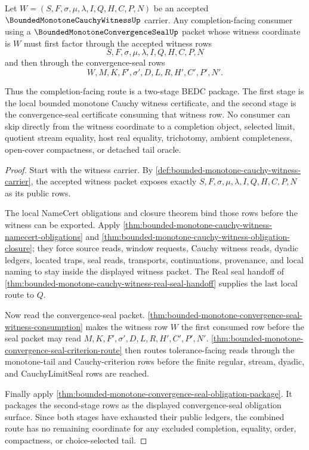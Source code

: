 \begin{theorem}
\label{thm:bounded-monotone-cauchy-witness-convergence-seal-factorization}
Let $W=(S,F,\sigma,\mu,\lambda,I,Q,H,C,P,N)$ be an accepted $\BoundedMonotoneCauchyWitnessUp$ carrier. Any completion-facing consumer using a $\BoundedMonotoneConvergenceSealUp$ packet whose witness coordinate is $W$ must first factor through the accepted witness rows
$$
S,F,\sigma,\mu,\lambda,I,Q,H,C,P,N
$$
and then through the convergence-seal rows
$$
W,M,K,F',\sigma',D,L,R,H',C',P',N'.
$$

Thus the completion-facing route is a two-stage BEDC package. The first stage is the local bounded monotone Cauchy witness certificate, and the second stage is the convergence-seal certificate consuming that witness row. No consumer can skip directly from the witness coordinate to a completion object, selected limit, quotient stream equality, host real equality, trichotomy, ambient completeness, open-cover compactness, or detached tail oracle.
\end{theorem}
\begin{proof}
Start with the witness carrier. By \autoref{def:bounded-monotone-cauchy-witness-carrier}, the accepted witness packet exposes exactly $S,F,\sigma,\mu,\lambda,I,Q,H,C,P,N$ as its public rows.

The local NameCert obligations and closure theorem bind those rows before the witness can be exported. Apply \autoref{thm:bounded-monotone-cauchy-witness-namecert-obligations} and \autoref{thm:bounded-monotone-cauchy-witness-obligation-closure}; they force source reads, window requests, Cauchy witness reads, dyadic ledgers, located traps, seal reads, transports, continuations, provenance, and local naming to stay inside the displayed witness packet. The Real seal handoff of \autoref{thm:bounded-monotone-cauchy-witness-real-seal-handoff} supplies the last local route to $Q$.

Now read the convergence-seal packet. \autoref{thm:bounded-monotone-convergence-seal-witness-consumption} makes the witness row $W$ the first consumed row before the seal packet may read $M,K,F',\sigma',D,L,R,H',C',P',N'$. \autoref{thm:bounded-monotone-convergence-seal-criterion-route} then routes tolerance-facing reads through the monotone-tail and Cauchy-criterion rows before the finite regular, stream, dyadic, and CauchyLimitSeal rows are reached.

Finally apply \autoref{thm:bounded-monotone-convergence-seal-obligation-package}. It packages the second-stage rows as the displayed convergence-seal obligation surface. Since both stages have exhausted their public ledgers, the combined route has no remaining coordinate for any excluded completion, equality, order, compactness, or choice-selected tail.
\end{proof}

